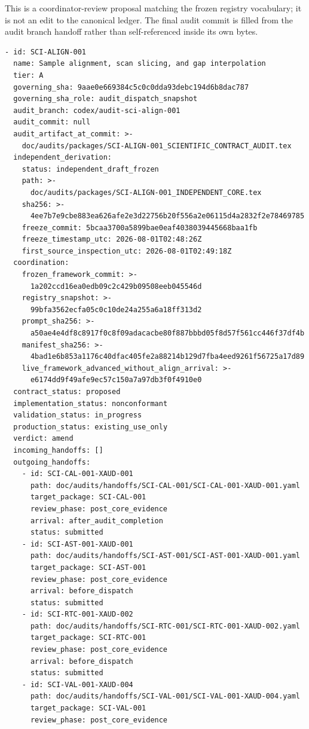 \documentclass[11pt]{article}
\begin{document}
This is a coordinator-review proposal matching the frozen registry vocabulary;
it is not an edit to the canonical ledger.  The final audit commit is filled
from the audit branch handoff rather than self-referenced inside its own bytes.

\begingroup
\small
\begin{verbatim}
- id: SCI-ALIGN-001
  name: Sample alignment, scan slicing, and gap interpolation
  tier: A
  governing_sha: 9aae0e669384c5c0c0dda93debc194d6b8dac787
  governing_sha_role: audit_dispatch_snapshot
  audit_branch: codex/audit-sci-align-001
  audit_commit: null
  audit_artifact_at_commit: >-
    doc/audits/packages/SCI-ALIGN-001_SCIENTIFIC_CONTRACT_AUDIT.tex
  independent_derivation:
    status: independent_draft_frozen
    path: >-
      doc/audits/packages/SCI-ALIGN-001_INDEPENDENT_CORE.tex
    sha256: >-
      4ee7b7e9cbe883ea626afe2e3d22756b20f556a2e06115d4a2832f2e78469785
    freeze_commit: 5bcaa3700a5899bae0eaf4038039445668baa1fb
    freeze_timestamp_utc: 2026-08-01T02:48:26Z
    first_source_inspection_utc: 2026-08-01T02:49:18Z
  coordination:
    frozen_framework_commit: >-
      1a202ccd16ea0edb09c2c429b09508eeb045546d
    registry_snapshot: >-
      99bfa3562ecfa05c0c10de24a255a6a18ff313d2
    prompt_sha256: >-
      a50ae4e4df8c8917f0c8f09adacacbe80f887bbbd05f8d57f561cc446f37df4b
    manifest_sha256: >-
      4bad1e6b853a1176c40dfac405fe2a88214b129d7fba4eed9261f56725a17d89
    live_framework_advanced_without_align_arrival: >-
      e6174dd9f49afe9ec57c150a7a97db3f0f4910e0
  contract_status: proposed
  implementation_status: nonconformant
  validation_status: in_progress
  production_status: existing_use_only
  verdict: amend
  incoming_handoffs: []
  outgoing_handoffs:
    - id: SCI-CAL-001-XAUD-001
      path: doc/audits/handoffs/SCI-CAL-001/SCI-CAL-001-XAUD-001.yaml
      target_package: SCI-CAL-001
      review_phase: post_core_evidence
      arrival: after_audit_completion
      status: submitted
    - id: SCI-AST-001-XAUD-001
      path: doc/audits/handoffs/SCI-AST-001/SCI-AST-001-XAUD-001.yaml
      target_package: SCI-AST-001
      review_phase: post_core_evidence
      arrival: before_dispatch
      status: submitted
    - id: SCI-RTC-001-XAUD-002
      path: doc/audits/handoffs/SCI-RTC-001/SCI-RTC-001-XAUD-002.yaml
      target_package: SCI-RTC-001
      review_phase: post_core_evidence
      arrival: before_dispatch
      status: submitted
    - id: SCI-VAL-001-XAUD-004
      path: doc/audits/handoffs/SCI-VAL-001/SCI-VAL-001-XAUD-004.yaml
      target_package: SCI-VAL-001
      review_phase: post_core_evidence

\end{verbatim}
\end{document}
